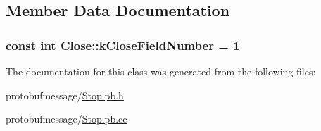 \subsection{Member Data Documentation}
\hypertarget{class_close_ae10c316a91463074882301092a5c07b1}{
\subsubsection[{k\-Close\-Field\-Number}]{\setlength{\rightskip}{0pt plus 5cm}const int Close\-::k\-Close\-Field\-Number = 1\hspace{0.3cm}{\ttfamily [static]}}}\label{class_close_ae10c316a91463074882301092a5c07b1}


The documentation for this class was generated from the following files\-:\begin{DoxyCompactItemize}
\item 
protobufmessage/\hyperlink{_stop_8pb_8h}{Stop.\-pb.\-h}\item 
protobufmessage/\hyperlink{_stop_8pb_8cc}{Stop.\-pb.\-cc}\end{DoxyCompactItemize}
